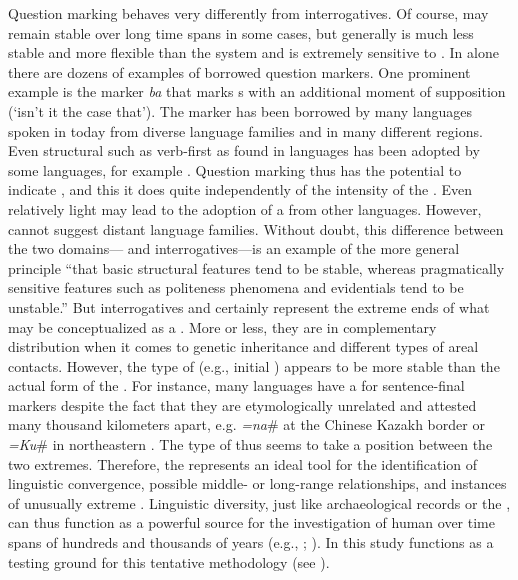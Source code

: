 Question marking behaves very differently from interrogatives. Of course,  may remain stable over long time spans in some cases, but generally is much less stable and more flexible than the  system and is extremely sensitive to . In  alone there are dozens of examples of borrowed question markers. One prominent example is the  marker \textit{ba}  that marks s with an additional moment of supposition (‘isn’t it the case that’). The marker has been borrowed by many languages spoken in  today from diverse language families and in many different regions. Even structural  such as verb-first  as found in  languages has been adopted by some  languages, for example \citep{Miestamo2011}. Question marking thus has the potential to indicate , and this it does quite independently of the intensity of the . Even relatively light  may lead to the adoption of a  from other languages. However,  cannot suggest distant language families. Without doubt, this difference between the two domains— and interrogatives—is an example of the more general principle “that basic structural features tend to be stable, whereas pragmatically sensitive features such as politeness phenomena and evidentials tend to be unstable.” \citep[3]{Trudgill2011} But interrogatives and  certainly represent the extreme ends of what may be conceptualized as a . More or less, they are in complementary distribution when it comes to genetic inheritance and different types of areal contacts. However, the type of  (e.g., initial ) appears to be more stable than the actual form of the . For instance, many  languages have a  for sentence-final  markers despite the fact that they are etymologically unrelated and attested many thousand kilometers apart, e.g.  \textit{=na}\# at the Chinese Kazakh border or  \textit{=Ku}\# in northeastern . The type of  thus seems to take a position between the two extremes. Therefore, the  represents an ideal tool for the identification of linguistic convergence, possible middle- or long-range relationships, and instances of unusually extreme . Linguistic diversity, just like archaeological records or the , can thus function as a powerful source for the investigation of human  over time spans of hundreds and thousands of years (e.g., \citealt{Nichols1992}; \citealt{HeggartyRenfrew2014a}). In this study  functions as a testing ground for this tentative methodology (see ).

